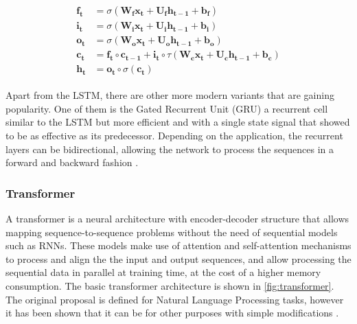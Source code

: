 \begin{align}
\label{eq:LSTM}
\begin{split}
	\mathbf{f_t} &= \sigma(\mathbf{W_f} \mathbf{x_t} + \mathbf{U_f} \mathbf{h_{t-1}} + \mathbf{b_f})\\
	\mathbf{i_t} &= \sigma(\mathbf{W_i} \mathbf{x_t} + \mathbf{U_i} \mathbf{h_{t-1}} + \mathbf{b_i})\\
	\mathbf{o_t} &= \sigma(\mathbf{W_o} \mathbf{x_t} + \mathbf{U_o} \mathbf{h_{t-1}} + \mathbf{b_o})\\
	\mathbf{c_t} &= \mathbf{f_t} \circ \mathbf{c_{t-1}} + \mathbf{i_t} \circ \tau (\mathbf{W_c} \mathbf{x_t} + \mathbf{U_c} \mathbf{h_{t-1}} + \mathbf{b_c})\\
	\mathbf{h_t} &= \mathbf{o_t} \circ \sigma(\mathbf{c_t})
\end{split}
\end{align}

Apart from the LSTM, there are other more modern variants that are gaining popularity. One of them is the Gated Recurrent Unit (GRU) \autocite{chung2014} a recurrent cell similar to the LSTM but more efficient and with a single state signal that showed to be as effective as its predecessor. Depending on the application, the recurrent layers can be bidirectional, allowing the network to process the sequences in a forward and backward fashion \autocite{schuster1997}.

\subsubsection{Transformer} \label{sec:transformer}
A transformer \autocite{vaswani2017} is a neural architecture with encoder-decoder structure that allows mapping sequence-to-sequence \autocite{sutskever2014} problems without the need of sequential models such as RNNs. These models make use of attention and self-attention mechanisms \autocite{bahdanau2015} to process and align the the input and output sequences, and allow processing the sequential data in parallel at training time, at the cost of a higher memory consumption. The basic transformer  architecture is shown in \ref{fig:transformer}. The original proposal is defined for Natural Language Processing tasks, however it has been shown that it can be for other purposes with simple modifications \autocite{naihan2019, jiarui2021, sanyuan2021}.

